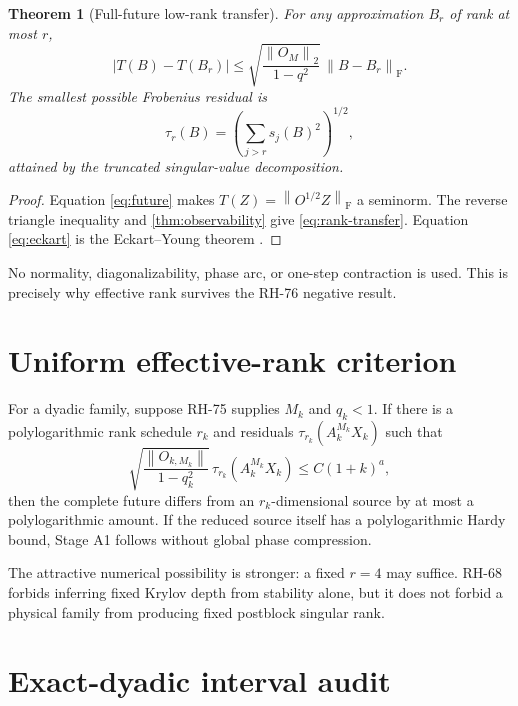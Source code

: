 \documentclass[11pt]{article}
\newtheorem{theorem}{Theorem}[section]
\newcommand{\norm}[1]{\left\lVert#1\right\rVert}
\newcommand{\F}{\mathrm F}
\begin{document}
\begin{theorem}[Full-future low-rank transfer]
\label{thm:rank-transfer}
For any approximation $B_r$ of rank at most $r$,
\begin{equation}
 |T(B)-T(B_r)|
 \le
 \sqrt{\frac{\norm{O_M}_2}{1-q^2}}\,
 \norm{B-B_r}_{\F}.
 \label{eq:rank-transfer}
\end{equation}
The smallest possible Frobenius residual is
\begin{equation}
 \tau_r(B)=\left(\sum_{j>r}s_j(B)^2\right)^{1/2},
 \label{eq:eckart}
\end{equation}
attained by the truncated singular-value decomposition.
\end{theorem}

\begin{proof}
Equation \eqref{eq:future} makes $T(Z)=\norm{O^{1/2}Z}_{\F}$ a seminorm.
The reverse triangle inequality and \cref{thm:observability} give
\eqref{eq:rank-transfer}.  Equation \eqref{eq:eckart} is the
Eckart--Young theorem \citep{EckartYoung1936}.
\end{proof}

No normality, diagonalizability, phase arc, or one-step contraction is used.
This is precisely why effective rank survives the RH-76 negative result.

\section{Uniform effective-rank criterion}

For a dyadic family, suppose RH-75 supplies $M_k$ and $q_k<1$.  If there is a
polylogarithmic rank schedule $r_k$ and residuals $\tau_{r_k}(A_k^{M_k}X_k)$
such that
\begin{equation}
 \sqrt{\frac{\norm{O_{k,M_k}}}{1-q_k^2}}\,
 \tau_{r_k}(A_k^{M_k}X_k)
 \le C(1+k)^a,
 \label{eq:uniform-rank}
\end{equation}
then the complete future differs from an $r_k$-dimensional source by at most a
polylogarithmic amount.  If the reduced source itself has a polylogarithmic
Hardy bound, Stage A1 follows without global phase compression.

The attractive numerical possibility is stronger: a fixed $r=4$ may suffice.
RH-68 forbids inferring fixed Krylov depth from stability alone, but it does
not forbid a physical family from producing fixed postblock singular rank.

\section{Exact-dyadic interval audit}
\end{document}
